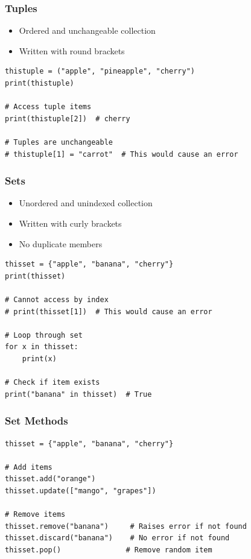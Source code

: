 \documentclass[aspectratio=169]{beamer}
\begin{document}
\begin{frame}[fragile]
\frametitle{Tuples}
\begin{itemize}
\item Ordered and unchangeable collection
\item Written with round brackets
\end{itemize}

\begin{lstlisting}
thistuple = ("apple", "pineapple", "cherry")
print(thistuple)

# Access tuple items
print(thistuple[2])  # cherry

# Tuples are unchangeable
# thistuple[1] = "carrot"  # This would cause an error
\end{lstlisting}
\end{frame}

\begin{frame}[fragile]
\frametitle{Sets}
\begin{itemize}
\item Unordered and unindexed collection
\item Written with curly brackets
\item No duplicate members
\end{itemize}

\begin{lstlisting}
thisset = {"apple", "banana", "cherry"}
print(thisset)

# Cannot access by index
# print(thisset[1])  # This would cause an error

# Loop through set
for x in thisset:
    print(x)

# Check if item exists
print("banana" in thisset)  # True
\end{lstlisting}
\end{frame}

\begin{frame}[fragile]
\frametitle{Set Methods}
\begin{lstlisting}
thisset = {"apple", "banana", "cherry"}

# Add items
thisset.add("orange")
thisset.update(["mango", "grapes"])

# Remove items
thisset.remove("banana")     # Raises error if not found
thisset.discard("banana")    # No error if not found
thisset.pop()               # Remove random item
\end{lstlisting}
\end{frame}
\end{document}
